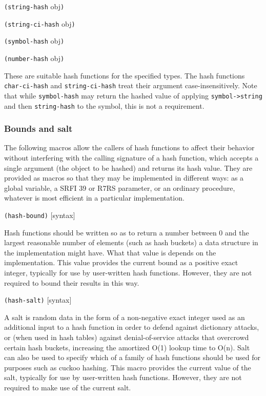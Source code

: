 \texttt{(string-hash} obj\texttt{)}

\texttt{(string-ci-hash} obj\texttt{)}

\texttt{(symbol-hash} obj\texttt{)}

\texttt{(number-hash} obj\texttt{)}

These are suitable hash functions for the specified types. The hash
functions \texttt{char-ci-hash} and \texttt{string-ci-hash} treat their
argument case-insensitively. Note that while \texttt{symbol-hash} may
return the hashed value of applying \texttt{symbol-\textgreater{}string}
and then \texttt{string-hash} to the symbol, this is not a requirement.

\hypertarget{Boundsandsalt}{\subsubsection{Bounds and
salt}\label{Boundsandsalt}}

The following macros allow the callers of hash functions to affect their
behavior without interfering with the calling signature of a hash
function, which accepts a single argument (the object to be hashed) and
returns its hash value. They are provided as macros so that they may be
implemented in different ways: as a global variable, a SRFI 39 or R7RS
parameter, or an ordinary procedure, whatever is most efficient in a
particular implementation.

\texttt{(hash-bound)} {[}syntax{]}

Hash functions should be written so as to return a number between 0 and
the largest reasonable number of elements (such as hash buckets) a data
structure in the implementation might have. What that value is depends
on the implementation. This value provides the current bound as a
positive exact integer, typically for use by user-written hash
functions. However, they are not required to bound their results in this
way.

\texttt{(hash-salt)} {[}syntax{]}

A salt is random data in the form of a non-negative exact integer used
as an additional input to a hash function in order to defend against
dictionary attacks, or (when used in hash tables) against
denial-of-service attacks that overcrowd certain hash buckets,
increasing the amortized O(1) lookup time to O(n). Salt can also be used
to specify which of a family of hash functions should be used for
purposes such as cuckoo hashing. This macro provides the current value
of the salt, typically for use by user-written hash functions. However,
they are not required to make use of the current salt.

